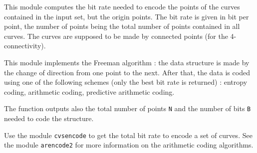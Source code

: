This module computes the bit rate needed to encode
the points of the curves contained in the input set, but
the origin points.
The bit rate is given in bit per point, the number of points being
the total number of points contained in all curves.
The curves are supposed to be made by connected points 
(for the 4-connectivity).

This module implements the Freeman algorithm : the data structure
is made by the change of direction from one point to the next.
After that, the data is coded using one of the following schemes
(only the best bit rate is returned) :
entropy coding, arithmetic coding, predictive arithmetic coding.

The function outputs also the total number of points \verb+N+
and the number of bits \verb+B+ needed to code the structure.

Use the module \verb+cvsencode+ to get the total bit rate to encode
a set of curves.
See the module \verb+arencode2+ for more information on the arithmetic
coding algorithms.

